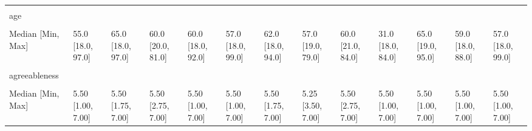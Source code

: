 \documentclass[
  single column]{article}
\begin{document}
\begin{landscape}
\begin{longtable}[t]{lllllllllllll}
\endfoot
\bottomrule
\endlastfoot
\cellcolor{gray!10}{} & \cellcolor{gray!10}{(N=21551)} & \cellcolor{gray!10}{(N=1363)} & \cellcolor{gray!10}{(N=270)} & \cellcolor{gray!10}{(N=2017)} & \cellcolor{gray!10}{(N=3696)} & \cellcolor{gray!10}{(N=1095)} & \cellcolor{gray!10}{(N=136)} & \cellcolor{gray!10}{(N=87)} & \cellcolor{gray!10}{(N=658)} & \cellcolor{gray!10}{(N=576)} & \cellcolor{gray!10}{(N=744)} & \cellcolor{gray!10}{(N=32193)}\\
age &  &  &  &  &  &  &  &  &  &  &  & \\
\cellcolor{gray!10}{Mean (SD)} & \cellcolor{gray!10}{51.6 (16.8)} & \cellcolor{gray!10}{63.3 (12.2)} & \cellcolor{gray!10}{56.2 (14.2)} & \cellcolor{gray!10}{56.4 (15.1)} & \cellcolor{gray!10}{53.0 (16.6)} & \cellcolor{gray!10}{59.1 (14.4)} & \cellcolor{gray!10}{52.0 (17.5)} & \cellcolor{gray!10}{54.7 (16.3)} & \cellcolor{gray!10}{33.8 (12.6)} & \cellcolor{gray!10}{64.1 (11.5)} & \cellcolor{gray!10}{54.2 (16.7)} & \cellcolor{gray!10}{52.8 (16.7)}\\
Median [Min, Max] & 55.0 [18.0, 97.0] & 65.0 [18.0, 97.0] & 60.0 [20.0, 81.0] & 60.0 [18.0, 92.0] & 57.0 [18.0, 99.0] & 62.0 [18.0, 94.0] & 57.0 [19.0, 79.0] & 60.0 [21.0, 84.0] & 31.0 [18.0, 84.0] & 65.0 [19.0, 95.0] & 59.0 [18.0, 88.0] & 57.0 [18.0, 99.0]\\
\cellcolor{gray!10}{Missing} & \cellcolor{gray!10}{0 (0\%)} & \cellcolor{gray!10}{0 (0\%)} & \cellcolor{gray!10}{0 (0\%)} & \cellcolor{gray!10}{0 (0\%)} & \cellcolor{gray!10}{1 (0.0\%)} & \cellcolor{gray!10}{0 (0\%)} & \cellcolor{gray!10}{0 (0\%)} & \cellcolor{gray!10}{0 (0\%)} & \cellcolor{gray!10}{21 (3.2\%)} & \cellcolor{gray!10}{0 (0\%)} & \cellcolor{gray!10}{0 (0\%)} & \cellcolor{gray!10}{22 (0.1\%)}\\
\addlinespace
agreeableness &  &  &  &  &  &  &  &  &  &  &  & \\
\cellcolor{gray!10}{Mean (SD)} & \cellcolor{gray!10}{5.30 (1.03)} & \cellcolor{gray!10}{5.46 (0.952)} & \cellcolor{gray!10}{5.49 (0.932)} & \cellcolor{gray!10}{5.34 (1.00)} & \cellcolor{gray!10}{5.44 (1.00)} & \cellcolor{gray!10}{5.38 (1.01)} & \cellcolor{gray!10}{5.36 (0.871)} & \cellcolor{gray!10}{5.47 (0.984)} & \cellcolor{gray!10}{5.30 (1.05)} & \cellcolor{gray!10}{5.39 (0.950)} & \cellcolor{gray!10}{5.36 (1.03)} & \cellcolor{gray!10}{5.34 (1.02)}\\
Median [Min, Max] & 5.50 [1.00, 7.00] & 5.50 [1.75, 7.00] & 5.50 [2.75, 7.00] & 5.50 [1.00, 7.00] & 5.50 [1.00, 7.00] & 5.50 [1.75, 7.00] & 5.25 [3.50, 7.00] & 5.50 [2.75, 7.00] & 5.50 [1.00, 7.00] & 5.50 [1.00, 7.00] & 5.50 [1.00, 7.00] & 5.50 [1.00, 7.00]\\

\end{longtable}
\end{landscape}
\end{document}
